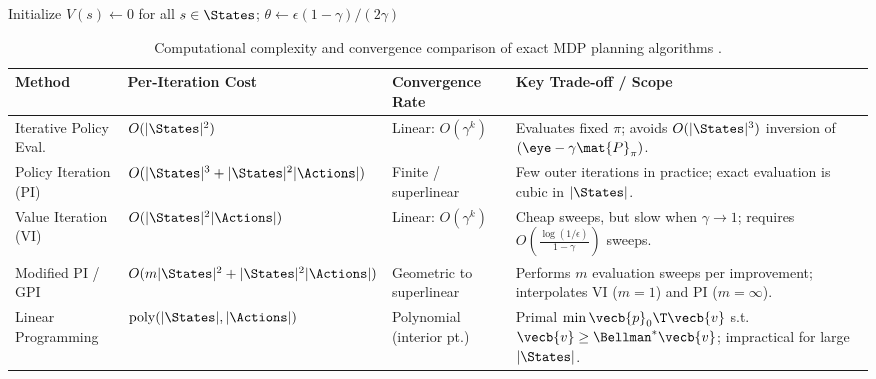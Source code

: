 \documentclass[../../../../master.tex]{subfiles}
\begin{document}
\begin{algorithm}[htbp]
\caption{Value Iteration (VI) with Contraction Stopping Bound}\label{alg:mdp:value_iteration}
Initialize $V(s) \leftarrow 0$ for all $s \in \States$; \quad $\theta \leftarrow \epsilon(1 - \gamma) / (2\gamma)$\;
\;
\end{algorithm}

\begin{table}[htbp]
\centering
\renewcommand{\arraystretch}{1.22}
\begin{tabularx}{\textwidth}{@{}l l l >{\raggedright\arraybackslash}X@{}}
\toprule
\textbf{Method} & \textbf{Per-Iteration Cost} & \textbf{Convergence Rate} & \textbf{Key Trade-off / Scope} \\
\midrule
Iterative Policy Eval. & $O(|\States|^2)$ & Linear: $O(\gamma^k)$ & Evaluates fixed $\pi$; avoids $O(|\States|^3)$ inversion of $(\eye - \gamma \mat{P}_\pi)$. \\
Policy Iteration (PI) & $O(|\States|^3 + |\States|^2 |\Actions|)$ & Finite / superlinear & Few outer iterations in practice; exact evaluation is cubic in $|\States|$. \\
Value Iteration (VI) & $O(|\States|^2 |\Actions|)$ & Linear: $O(\gamma^k)$ & Cheap sweeps, but slow when $\gamma \to 1$; requires $O\!\left(\frac{\log(1/\epsilon)}{1-\gamma}\right)$ sweeps. \\
Modified PI / GPI & $O(m|\States|^2 + |\States|^2 |\Actions|)$ & Geometric to superlinear & Performs $m$ evaluation sweeps per improvement; interpolates VI ($m=1$) and PI ($m=\infty$). \\
Linear Programming & $\mathrm{poly}(|\States|, |\Actions|)$ & Polynomial (interior pt.) & Primal $\min \vecb{p}_0\T \vecb{v}$ s.t. $\vecb{v} \ge \Bellman^* \vecb{v}$; impractical for large $|\States|$. \\
\bottomrule
\end{tabularx}
\caption{Computational complexity and convergence comparison of exact MDP planning algorithms .}\label{tab:mdp:complexity}
\end{table}
\end{document}
